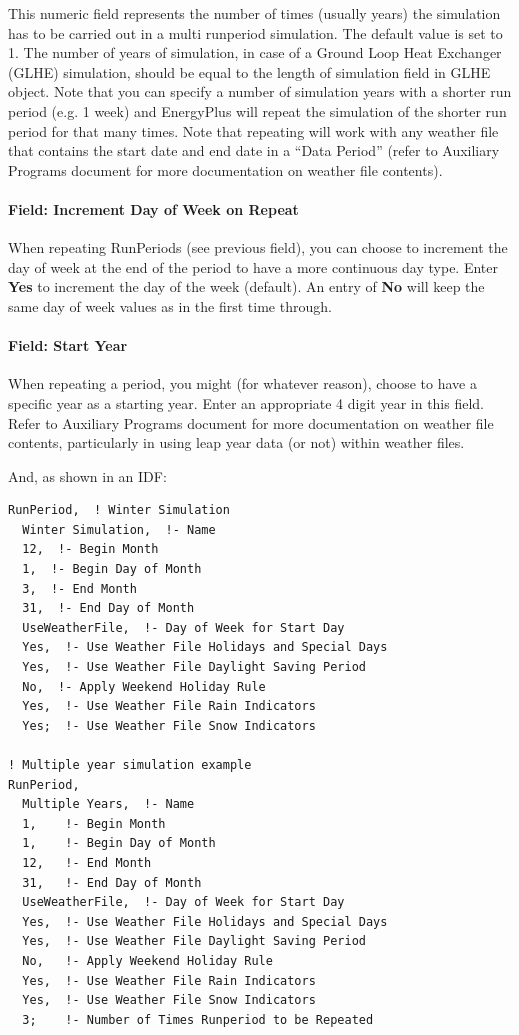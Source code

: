 This numeric field represents the number of times (usually years) the simulation has to be carried out in a multi runperiod simulation. The default value is set to 1. The number of years of simulation, in case of a Ground Loop Heat Exchanger (GLHE) simulation, should be equal to the length of simulation field in GLHE object. Note that you can specify a number of simulation years with a shorter run period (e.g. 1 week) and EnergyPlus will repeat the simulation of the shorter run period for that many times. Note that repeating will work with any weather file that contains the start date and end date in a ``Data Period'' (refer to Auxiliary Programs document for more documentation on weather file contents).

\paragraph{Field: Increment Day of Week on Repeat}\label{field-increment-day-of-week-on-repeat}

When repeating RunPeriods (see previous field), you can choose to increment the day of week at the end of the period to have a more continuous day type. Enter \textbf{Yes} to increment the day of the week (default). An entry of \textbf{No} will keep the same day of week values as in the first time through.

\paragraph{Field: Start Year}\label{field-start-year}

When repeating a period, you might (for whatever reason), choose to have a specific year as a starting year. Enter an appropriate 4 digit year in this field. Refer to Auxiliary Programs document for more documentation on weather file contents, particularly in using leap year data (or not) within weather files.

And, as shown in an IDF:

\begin{lstlisting}
RunPeriod,  ! Winter Simulation
  Winter Simulation,  !- Name
  12,  !- Begin Month
  1,  !- Begin Day of Month
  3,  !- End Month
  31,  !- End Day of Month
  UseWeatherFile,  !- Day of Week for Start Day
  Yes,  !- Use Weather File Holidays and Special Days
  Yes,  !- Use Weather File Daylight Saving Period
  No,  !- Apply Weekend Holiday Rule
  Yes,  !- Use Weather File Rain Indicators
  Yes;  !- Use Weather File Snow Indicators

! Multiple year simulation example
RunPeriod,
  Multiple Years,  !- Name
  1,    !- Begin Month
  1,    !- Begin Day of Month
  12,   !- End Month
  31,   !- End Day of Month
  UseWeatherFile,  !- Day of Week for Start Day
  Yes,  !- Use Weather File Holidays and Special Days
  Yes,  !- Use Weather File Daylight Saving Period
  No,   !- Apply Weekend Holiday Rule
  Yes,  !- Use Weather File Rain Indicators
  Yes,  !- Use Weather File Snow Indicators
  3;    !- Number of Times Runperiod to be Repeated
\end{lstlisting}

